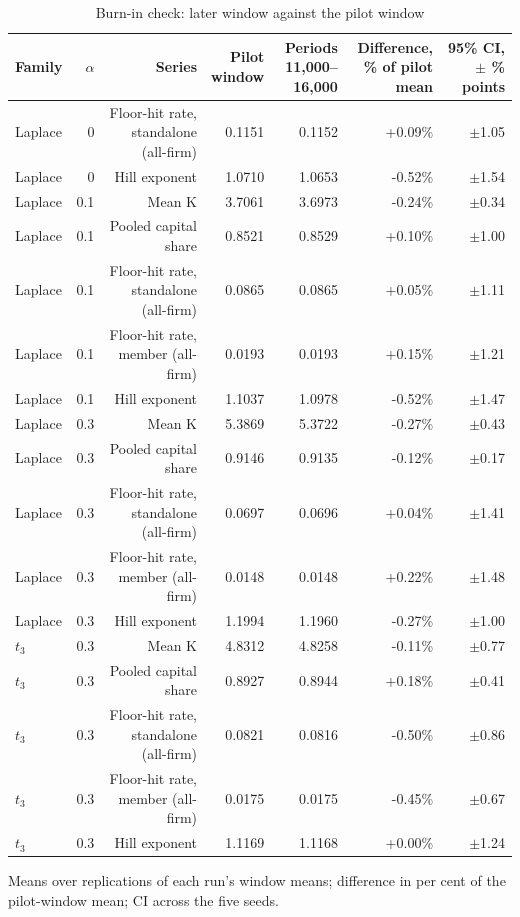 \begin{table}
\centering
\caption{Burn-in check: later window against the pilot window}
\label{tab:a3_burnin}
\small
\begin{tabular}{lrrrrrr}
\toprule
Family & $\alpha$ & Series & \makecell[b]{Pilot\\{}window} & \makecell[b]{Periods\\{}11,000--16,000} & \makecell[b]{Difference,\\{}\% of pilot mean} & \makecell[b]{95\% CI,\\{}$\pm$ \% points} \\
\midrule
Laplace & 0 & Floor-hit rate, standalone (all-firm) & 0.1151 & 0.1152 & +0.09\% & $\pm$1.05 \\
Laplace & 0 & Hill exponent & 1.0710 & 1.0653 & -0.52\% & $\pm$1.54 \\
Laplace & 0.1 & Mean K & 3.7061 & 3.6973 & -0.24\% & $\pm$0.34 \\
Laplace & 0.1 & Pooled capital share & 0.8521 & 0.8529 & +0.10\% & $\pm$1.00 \\
Laplace & 0.1 & Floor-hit rate, standalone (all-firm) & 0.0865 & 0.0865 & +0.05\% & $\pm$1.11 \\
Laplace & 0.1 & Floor-hit rate, member (all-firm) & 0.0193 & 0.0193 & +0.15\% & $\pm$1.21 \\
Laplace & 0.1 & Hill exponent & 1.1037 & 1.0978 & -0.52\% & $\pm$1.47 \\
Laplace & 0.3 & Mean K & 5.3869 & 5.3722 & -0.27\% & $\pm$0.43 \\
Laplace & 0.3 & Pooled capital share & 0.9146 & 0.9135 & -0.12\% & $\pm$0.17 \\
Laplace & 0.3 & Floor-hit rate, standalone (all-firm) & 0.0697 & 0.0696 & +0.04\% & $\pm$1.41 \\
Laplace & 0.3 & Floor-hit rate, member (all-firm) & 0.0148 & 0.0148 & +0.22\% & $\pm$1.48 \\
Laplace & 0.3 & Hill exponent & 1.1994 & 1.1960 & -0.27\% & $\pm$1.00 \\
$t_3$ & 0.3 & Mean K & 4.8312 & 4.8258 & -0.11\% & $\pm$0.77 \\
$t_3$ & 0.3 & Pooled capital share & 0.8927 & 0.8944 & +0.18\% & $\pm$0.41 \\
$t_3$ & 0.3 & Floor-hit rate, standalone (all-firm) & 0.0821 & 0.0816 & -0.50\% & $\pm$0.86 \\
$t_3$ & 0.3 & Floor-hit rate, member (all-firm) & 0.0175 & 0.0175 & -0.45\% & $\pm$0.67 \\
$t_3$ & 0.3 & Hill exponent & 1.1169 & 1.1168 & +0.00\% & $\pm$1.24 \\
\bottomrule
\end{tabular}
\par\smallskip\begin{minipage}{0.95\linewidth}\footnotesize Means over replications of each run's window means; difference in per cent of the pilot-window mean; CI across the five seeds.\end{minipage}
\end{table}
